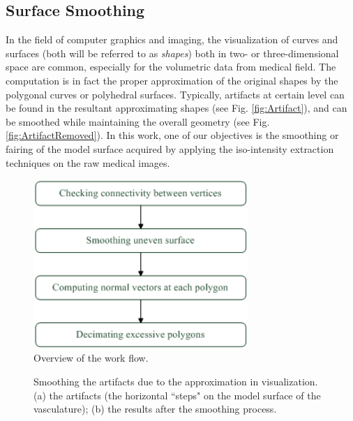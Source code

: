 \subsection{Surface Smoothing}

In the field of computer graphics and imaging, the visualization of curves and surfaces (both will be referred to as \emph{shapes}) both in two- or three-dimensional space are common, especially for the volumetric data from medical field. %
The computation is in fact the proper approximation of the original shapes by the polygonal curves or polyhedral surfaces.
Typically, artifacts at certain level can be found in the resultant approximating shapes (see Fig. \ref{fig:Artifact}), and can be smoothed while maintaining the overall geometry (see Fig. \ref{fig:ArtifactRemoved}). %
In this work, one of our objectives is the smoothing or fairing of the model surface acquired by applying the iso-intensity extraction techniques on the raw medical images.
\begin{figure}[t]
\centering
\includegraphics[width=3.2in]{Figures/chap06/DataFlow.png}
\caption{Overview of the work flow.}
\label{fig:DataFlow}
\end{figure}
\begin{figure}[t]
\centering
{}
\hfil
{}
\caption{Smoothing the artifacts due to the approximation in visualization. (a) the artifacts (the horizontal ``steps" on the model surface of the vasculature); (b) the results after the smoothing process.}%
\label{fig:ArtifactComparison}
\end{figure}
